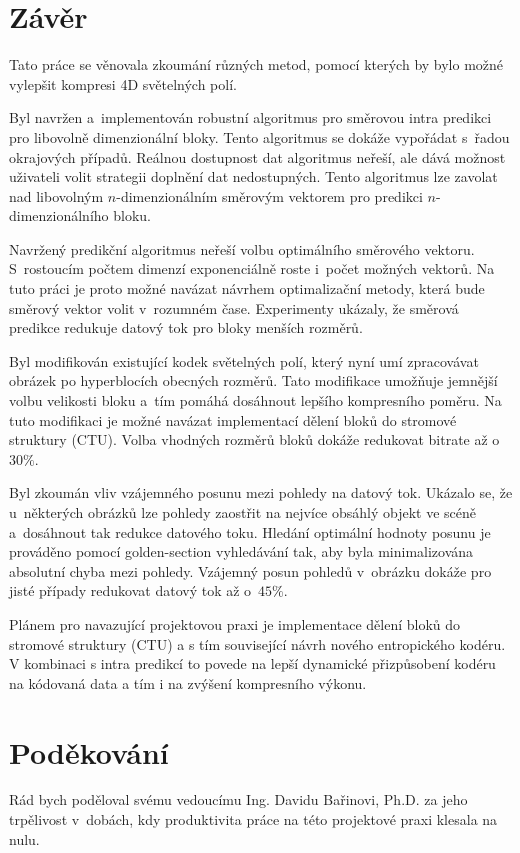 \section{Závěr}
\label{sec:Conclusions}
Tato práce se věnovala zkoumání různých me\-to\-d, pomocí kterých by bylo možné vylepšit kom\-pre\-si 4D světelných polí.

Byl navržen a~implementován robustní algoritmus pro směr\-ovou intra pre\-dikci pro libovolně dimenzionální bloky.
Tento algoritmus se dokáže vypořádat s~řadou okrajových případů.
Reálnou dostupnost dat algoritmus neřeší, ale dává možnost uživateli volit strategii doplnění dat nedostupných.
Tento algoritmus lze zavolat nad libovolným $n$-dimenzionálním směr\-ovým vektorem pro pre\-dikci $n$-dimenzionálního bloku.

Navržený pre\-dikční algoritmus neřeší volbu optimálního směr\-ového vektoru.
S~rostoucím počtem dimenzí exponenciálně roste i~počet možných vektorů.
Na tuto práci je proto možné navázat návrhem optimalizační me\-to\-dy, která bude směr\-ový vektor volit v~rozumném čase.
Experimenty ukázaly, že směrová pre\-dikce redukuje datový tok pro bloky menších roz\-měrů.

Byl modifikován existující kodek světelných polí, který nyní umí zpracovávat obrázek po hyperblocích obecných roz\-měrů.
Tato modifikace umožňuje jemnější volbu velikosti bloku a~tím pomáhá dosáhnout lepšího kom\-pre\-sního poměru.
Na tuto modifikaci je možné navázat implementací dělení bloků do stromové struktury (CTU).
Volba vhodných roz\-měrů bloků dokáže redukovat bitrate až o~$30 \%$.

Byl zkoumán vliv vzájemného posunu mezi po\-hledy na datový tok.
Ukázalo se, že u~některých obrázků lze po\-hledy zaostřit na nejvíce obsáhlý objekt ve scéně a~dosáhnout tak redukce datového toku.
Hledání optimální hodnoty posunu je prováděno pomocí golden-section vyhledávání tak, aby byla minimalizována absolutní chyba mezi po\-hledy.
Vzájemný posun pohledů v~obrázku dokáže pro jisté případy redukovat datový tok až o~$45 \%$.

Plánem pro navazující projektovou praxi je implementace dělení bloků do stromové struktury (CTU) a s tím související návrh nového entropického kodéru.
V kombinaci s intra predikcí to povede na lepší dynamické přizpůsobení kodéru na kódovaná data a tím i na zvýšení kompresního výkonu.

\section*{Poděkování}
Rád bych poděloval svému vedoucímu Ing. Davidu Bařinovi, Ph.D. za jeho trpělivost v~dobách, kdy produktivita práce na této projektové praxi klesala na nulu.
